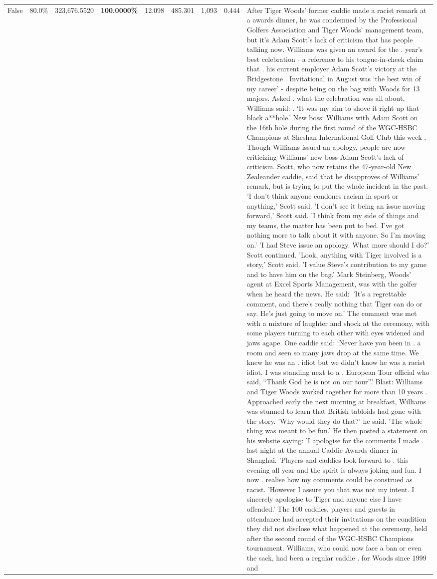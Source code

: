 \begin{table}[H]
\begin{tabular}{lllrlllll}
False & 80.0\% & 323,676.5520 & \bfseries \color{red} 100.0000\% & 12.098 & 485.301 & 1,093 & 0.444 & After Tiger Woods' former caddie made a racist remark at a awards dinner, he was condemned by the Professional Golfers Association and Tiger Woods' management team, but it's Adam Scott's lack of criticism that has people talking now. Williams was given an award for the . year’s best celebration - a reference to his tongue-in-cheek claim that . his current employer Adam Scott’s victory at the Bridgestone . Invitational in August was ‘the best win of my career’ - despite being on the bag with Woods for 13 majors. Asked . what the celebration was all about, Williams said: . ‘It was my aim to shove it right up that black a**hole.’ New boss: Williams with Adam Scott  on the 16th hole during the first round of the WGC-HSBC Champions at Sheshan International Golf Club this week . Though Williams issued an apology, people are now criticizing Williams' new boss Adam Scott's lack of criticism. Scott, who now retains the 47-year-old New Zealeander caddie, said that he disapproves of Williams' remark, but is trying to put the whole incident in the past. 'I don't think anyone condones racism in sport or anything,' Scott said. 'I don't see it being an issue moving forward,' Scott said. 'I think from my side of things and my teams, the matter has been put to bed. I've got nothing more to talk about it with anyone. So I'm moving on.' 'I had Steve issue an apology. What more should I do?' Scott continued. 'Look, anything with Tiger involved is a story,' Scott said. 'I value Steve's contribution to my game and to have him on the bag.' Mark Steinberg, Woods' agent at Excel Sports Management, was with the golfer when he heard the news. He said: 'It's a regrettable comment, and there's really nothing that Tiger can do or say. He's just going to move on.' The comment was met with a mixture of laughter and shock at the ceremony, with some players turning to each other with eyes widened and jaws agape. One caddie said: ‘Never have you been in . a room and seen so many jaws drop at the same time. We knew he was an . idiot but we didn’t know he was a racist idiot. I was standing next to a . European Tour official who said, “Thank God he is not on our tour”.’ Blast: Williams and Tiger Woods worked together for more than 10 years . Approached early the next morning at breakfast, Williams was stunned to learn that British tabloids had gone with the story. 'Why would they do that?' he said. 'The whole thing was meant to be fun.' He then posted a statement on his website saying: 'I apologise for the comments I made . last night at the annual Caddie Awards dinner in Shanghai. 'Players and caddies look forward to . this evening all year and the spirit is always joking and fun. I now . realise how my comments could be construed as racist. 'However I assure you that was not my intent. I sincerely apologise to Tiger and anyone else I have offended.' The 100 caddies, players and guests in attendance had accepted their invitations on the condition they did not disclose what happened at the ceremony, held after the second round of the WGC-HSBC Champions tournament. Williams, who could now face a ban or even the sack, had been a regular caddie . for Woods since 1999 and 
\end{tabular}
\end{table}

